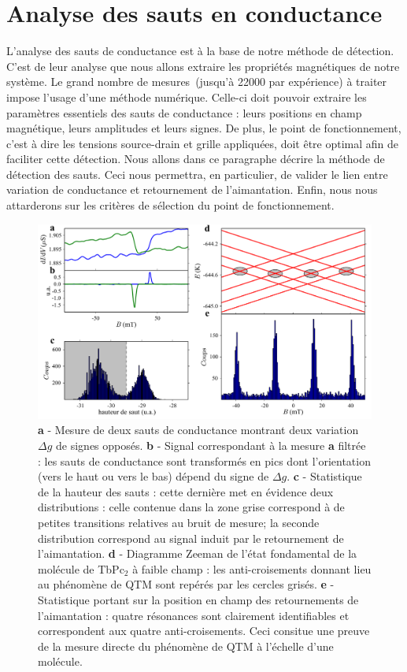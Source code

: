 \section{Analyse des sauts en conductance}
L'analyse des sauts de conductance est à la base de notre méthode de détection. C'est de leur analyse que nous allons extraire les propriétés magnétiques de notre système. Le grand nombre de mesures~(jusqu'à 22000 par expérience) à traiter impose l'usage d'une méthode numérique. Celle-ci doit pouvoir extraire les paramètres essentiels des sauts de conductance : leurs positions en champ magnétique, leurs amplitudes et leurs signes. De plus, le point de fonctionnement, c'est à dire les tensions source-drain et grille appliquées, doit être optimal afin de faciliter cette détection. Nous allons dans ce paragraphe décrire la méthode de détection des sauts. Ceci nous permettra, en particulier, de valider le lien entre variation de conductance et retournement de l'aimantation. Enfin, nous nous attarderons sur les critères de sélection du point de fonctionnement.

\begin{figure}
\includegraphics[scale=0.45]{Resultats/Chap1/Figure3/figure3.pdf} 
\caption{\textbf{a} - Mesure de deux sauts de conductance montrant deux variation $\Delta g$ de signes opposés. \textbf{b} - Signal correspondant à la mesure \textbf{a} filtrée : les sauts de conductance sont transformés en pics dont l'orientation (vers le haut ou vers le bas) dépend du signe de $\Delta g$. \textbf{c} - Statistique de la hauteur des sauts : cette dernière met en évidence deux distributions : celle contenue dans la zone grise correspond à de petites transitions relatives au bruit de mesure; la seconde distribution correspond au signal induit par le retournement de l'aimantation. \textbf{d} - Diagramme Zeeman de l'état fondamental de la molécule de TbPc$_2$ à faible champ : les anti-croisements donnant lieu au phénomène de QTM sont repérés par les cercles grisés. \textbf{e} - Statistique portant sur la position en champ des retournements de l'aimantation : quatre résonances sont clairement identifiables et correspondent aux quatre anti-croisements. Ceci consitue une preuve de la mesure directe du phénomène de QTM à l'échelle d'une molécule.}
\label{analyse_saut}
\end{figure}

